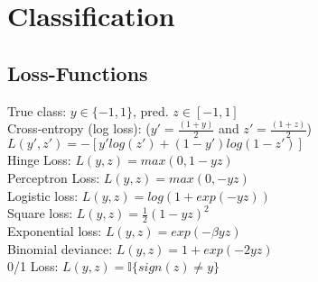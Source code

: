 \section{Classification}
\subsection*{Loss-Functions}
True class: $y \in \{-1,1\}$, pred. $z \in [-1,1]$\\
Cross-entropy (log loss): ($y'=\tfrac{(1+y)}{2}$ and $z'=\tfrac{(1+z)}{2}$) $L(y',z') {=} -[y'log(z') {+} (1-y')log(1-z')]$ \\
Hinge Loss: $L(y,z) = max(0, 1-yz)$ \\
Perceptron Loss: $L(y,z) = max(0, -yz)$ \\
Logistic loss: $L(y,z) = log(1 + exp(-yz))$ \\
Square loss: $L(y,z) = \tfrac{1}{2}(1-yz)^2$ \\
Exponential loss: $L(y,z) = exp(-\beta yz)$ \\
Binomial deviance: $L(y,z) = 1 + exp(-2yz)$ \\
0/1 Loss: $L(y,z) = \mathbb{I}\{sign(z)\neq y\}$ \\

